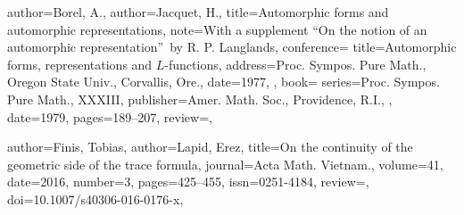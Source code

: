 \documentclass[11pt]{amsart}
\theoremstyle{remark}
\begin{document}
\begin{bibdiv}
\begin{biblist}
    {
       author={Borel, A.},
       author={Jacquet, H.},
       title={Automorphic forms and automorphic representations},
       note={With a supplement ``On the notion of an automorphic
       representation''\ by R. P. Langlands},
       conference={
          title={Automorphic forms, representations and $L$-functions},
          address={Proc. Sympos. Pure Math., Oregon State Univ., Corvallis,
          Ore.},
          date={1977},
       },
       book={
          series={Proc. Sympos. Pure Math., XXXIII},
          publisher={Amer. Math. Soc., Providence, R.I.},
       },
       date={1979},
       pages={189--207},
       review={},
    }
 
%   
%    
%    

   {
	   author={Finis, Tobias},
	   author={Lapid, Erez},
	   title={On the continuity of the geometric side of the trace formula},
	   journal={Acta Math. Vietnam.},
	   volume={41},
	   date={2016},
	   number={3},
	   pages={425--455},
	   issn={0251-4184},
	   review={},
	   doi={10.1007/s40306-016-0176-x},
	}


\end{biblist}
\end{bibdiv}
\end{document}
